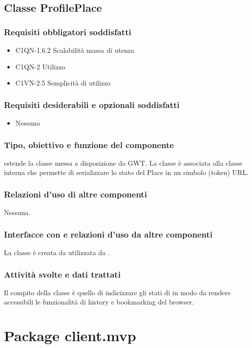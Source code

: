 \subsection{Classe ProfilePlace}
\subsubsection*{Requisiti obbligatori soddisfatti}
\begin{itemize}
    \item C1QN-1.6.2 Scalabilit\`a massa di utenza
    \item C1QN-2 Utilizzo
    \item C1VN-2.5 Semplicit\`a di utilizzo
\end{itemize}
\subsubsection*{Requisiti desiderabili e opzionali soddisfatti}
\begin{itemize}
    \item Nessuno
\end{itemize}
\subsubsection*{Tipo, obiettivo e funzione del componente}
 estende la classe  messa a disposizione da GWT. La
classe \`e associata alla classe interna  che permette di
serializzare lo stato del Place in un simbolo (token) URL.
\subsubsection*{Relazioni d'uso di altre componenti}
Nessuna.
\subsubsection*{Interfacce con e relazioni d'uso da altre componenti}
La classe \`e creata da  utilizzata da .
\subsubsection*{Attivit\`a svolte e dati trattati}
Il compito della classe \`e quello di indicizzare gli stati di
 in modo da rendere accessibili le funzionalit\`a di history
e bookmarking del browser.



\newpage
\section{Package client.mvp}

